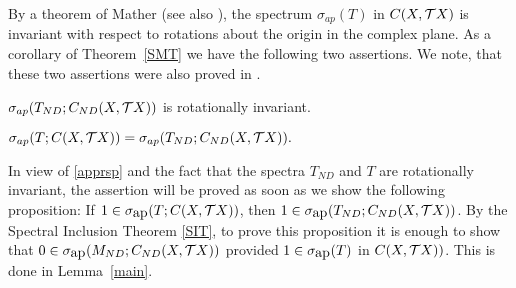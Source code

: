 By a theorem  of Mather \cite{Mather} (see also \cite{CS,LS}),
the spectrum $\sigma_{ap} (T)$ in ${C(X,{{\cal{T}}X})}$
is  invariant with respect to rotations about the
origin  in the complex plane.
As a corollary of  Theorem~\ref{SMT} we have the following two
assertions. We note, that these two assertions were also proved in
\cite{Rafael}.
\begin{cor} $\sigma_{ap} (T_{ND}; {C_{ND}(X,{{\cal{T}}X})})$ is
rotationally invariant. \end{cor}
\begin{cor}
$\sigma_{ap} (T; C(X,{{\cal{T}}X})) =
\sigma_{ap}
(T_{ND}; C_{ND}(X, {{\cal{T}}X})).$
\end{cor}
\begin{pf}
In view of \eqref{apprsp} and the fact that the
spectra $T_{ND}$ and $T$ are rotationally invariant,
the assertion will be proved as soon as we show
the following proposition:  If $1\in\sigma_{\mbox{ap}}(T; C(X,{{\cal{T}}X}))$, then
$1\in\sigma_{\mbox{ap}}(T_{ND}; C_{ND}(X,{{\cal{T}}X}))$.
By the Spectral Inclusion Theorem \eqref{SIT}, to prove this
proposition it is enough to show that
$0\in\sigma_{\mbox{ap}}(M_{ND};{C_{ND}(X,{{\cal{T}}X})})$ provided $1\in\sigma_{\mbox{ap}}(T)$ in $ C(X,{{\cal{T}}X}))$.
This is done in
Lemma~\ref{main}.
\end{pf}


